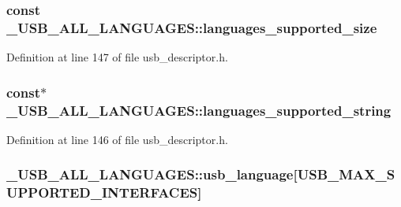 \subsubsection[{\texorpdfstring{languages\+\_\+supported\+\_\+size}{languages_supported_size}}]{ const \+\_\+\+U\+S\+B\+\_\+\+A\+L\+L\+\_\+\+L\+A\+N\+G\+U\+A\+G\+E\+S\+::languages\+\_\+supported\+\_\+size}\hypertarget{struct___u_s_b___a_l_l___l_a_n_g_u_a_g_e_s_a717b82500018c7be6466dfadd0d114e5}{}\label{struct___u_s_b___a_l_l___l_a_n_g_u_a_g_e_s_a717b82500018c7be6466dfadd0d114e5}


Definition at line 147 of file usb\+\_\+descriptor.\+h.

\subsubsection[{\texorpdfstring{languages\+\_\+supported\+\_\+string}{languages_supported_string}}]{ const$\ast$ \+\_\+\+U\+S\+B\+\_\+\+A\+L\+L\+\_\+\+L\+A\+N\+G\+U\+A\+G\+E\+S\+::languages\+\_\+supported\+\_\+string}\hypertarget{struct___u_s_b___a_l_l___l_a_n_g_u_a_g_e_s_ab386d6509768eb969ac327dcafb61c91}{}\label{struct___u_s_b___a_l_l___l_a_n_g_u_a_g_e_s_ab386d6509768eb969ac327dcafb61c91}


Definition at line 146 of file usb\+\_\+descriptor.\+h.

\subsubsection[{\texorpdfstring{usb\+\_\+language}{usb_language}}]{ \+\_\+\+U\+S\+B\+\_\+\+A\+L\+L\+\_\+\+L\+A\+N\+G\+U\+A\+G\+E\+S\+::usb\+\_\+language\mbox{[}{\bf U\+S\+B\+\_\+\+M\+A\+X\+\_\+\+S\+U\+P\+P\+O\+R\+T\+E\+D\+\_\+\+I\+N\+T\+E\+R\+F\+A\+C\+ES}\mbox{]}}\hypertarget{struct___u_s_b___a_l_l___l_a_n_g_u_a_g_e_s_a79d81619921ca510eecf662b2ad22d27}{}\label{struct___u_s_b___a_l_l___l_a_n_g_u_a_g_e_s_a79d81619921ca510eecf662b2ad22d27}


